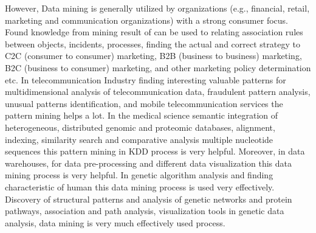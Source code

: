 However, Data mining is generally utilized by organizations (e.g., financial, retail, marketing and communication organizations) with a strong consumer focus. Found knowledge from mining result of can be used to relating association rules between objects, incidents, processes, finding the actual and correct strategy to C2C (consumer to consumer) marketing, B2B (business to business) marketing, B2C (business to consumer) marketing, and other marketing policy determination etc. In telecommunication Industry finding interesting valuable patterns for multidimensional analysis of telecommunication data, fraudulent pattern analysis, unusual patterns identification, and mobile telecommunication services the pattern mining helps a lot. In the medical science semantic integration of heterogeneous, distributed genomic and proteomic databases, alignment, indexing, similarity search and comparative analysis multiple nucleotide sequences this pattern mining in KDD process is very helpful. Moreover, in data warehouses, for data pre-processing and different data visualization this data mining process is very helpful. In genetic algorithm analysis and finding characteristic of human this data mining process is used very effectively. Discovery of structural patterns and analysis of genetic networks and protein pathways, association and path analysis, visualization tools in genetic data analysis, data mining is very much effectively used process.


